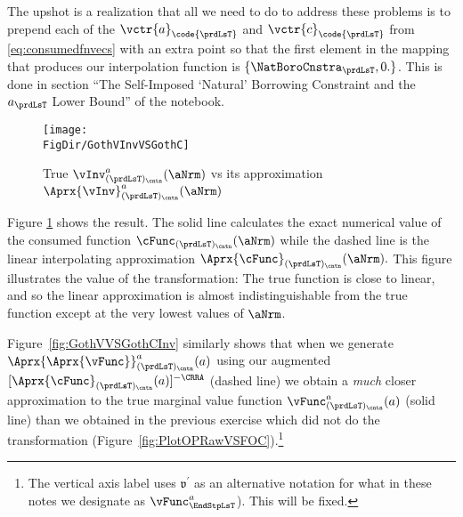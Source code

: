 \documentclass[\econtexRoot/SolvingMicroDSOPs]{subfiles}
\begin{document}
The upshot is a realization that all we need to do to address these problems is to prepend each of the $\vctr{a}_{\code{\prdLsT}}$ and $\vctr{c}_{\code{\prdLsT}}$ from \eqref{eq:consumedfnvecs} with an extra point so that the first element in the mapping that produces our interpolation function is $\{\NatBoroCnstra_{\prdLsT},0.\}$. This is done in section ``The Self-Imposed `Natural' Borrowing Constraint and the $a_{\prdLsT}$ Lower Bound'' of the notebook.%


\hypertarget{GothVInvVSGothC}{}
\begin{figure}
  \centerline{\texttt{[image: \\FigDir/GothVInvVSGothC]}}
  \caption{True $\vInv^{a}_{(\prdLsT)_\cntn}(\aNrm)$ vs its approximation $\Aprx{\vInv}^{a}_{(\prdLsT)_\cntn}(\aNrm)$}
  \label{fig:GothVInvVSGothC}
\end{figure}

Figure \ref{fig:GothVInvVSGothC} shows the result. The solid line calculates the exact numerical value of the consumed function $\cFunc_{(\prdLsT)_\cntn}(\aNrm)$ while the dashed line is the linear interpolating approximation $\Aprx{\cFunc}_{(\prdLsT)_\cntn}(\aNrm).$ This figure illustrates the value of the transformation: The true function is close to linear, and so the linear approximation is almost indistinguishable from the true function except at the very lowest values of $\aNrm$.

Figure~\ref{fig:GothVVSGothCInv} similarly shows that when we generate $\Aprx{\Aprx{\vFunc}}_{(\prdLsT)_\cntn}^{a}(a)$ using our augmented $[\Aprx{\cFunc}_{(\prdLsT)_\cntn}(a)]^{-\CRRA}$ (dashed line) we obtain a \textit{much} closer approximation to the true marginal value function $\vFunc^{a}_{(\prdLsT)_\cntn}(a)$ (solid line) than we obtained in the previous exercise which did not do the transformation (Figure~\ref{fig:PlotOPRawVSFOC}).\footnote{The vertical axis label uses $\mathfrak{v}^{\prime}$ as an alternative notation for what in these notes we designate as $\vFunc^{a}_{\EndStpLsT}$).  This will be fixed.}
\end{document}
